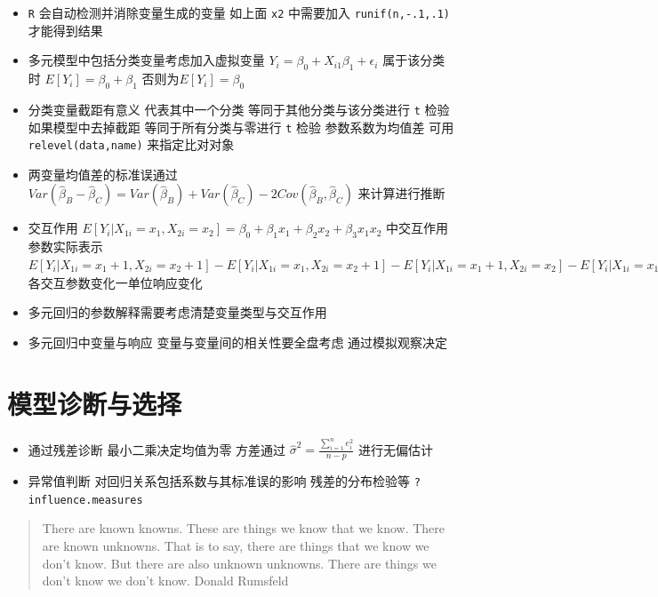 \documentclass[]{book}
\providecommand{\tightlist}{%
  \setlength{\itemsep}{0pt}\setlength{\parskip}{0pt}}
\begin{document}
\begin{itemize}
\tightlist
\item
  \texttt{R} 会自动检测并消除变量生成的变量 如上面 \texttt{x2} 中需要加入 \texttt{runif(n,-.1,.1)} 才能得到结果
\item
  多元模型中包括分类变量考虑加入虚拟变量 \(Y_i = \beta_0 + X_{i1} \beta_1 + \epsilon_{i}\) 属于该分类时 \(E[Y_i] = \beta_0 + \beta_1\) 否则为\(E[Y_i] = \beta_0\)
\item
  分类变量截距有意义 代表其中一个分类 等同于其他分类与该分类进行 \texttt{t} 检验 如果模型中去掉截距 等同于所有分类与零进行 \texttt{t} 检验 参数系数为均值差 可用 \texttt{relevel(data,\textquotesingle{}name\textquotesingle{})} 来指定比对对象
\item
  两变量均值差的标准误通过 \(Var(\hat \beta_B - \hat \beta_C) = Var(\hat \beta_B) + Var(\hat \beta_C) - 2 Cov(\hat \beta_B, \hat \beta_C)\) 来计算进行推断
\item
  交互作用 \(E[Y_i | X_{1i}=x_1, X_{2i}=x_2] = \beta_0 + \beta_1 x_{1} + \beta_2 x_{2} + \beta_3 x_{1}x_{2}\) 中交互作用参数实际表示 \(E[Y_i | X_{1i}=x_1+1, X_{2i}=x_2+1]-E[Y_i | X_{1i}=x_1, X_{2i}=x_2+1]-E[Y_i | X_{1i}=x_1+1, X_{2i}=x_2]-E[Y_i | X_{1i}=x_1, X_{2i}=x_2] =\beta_3\) 各交互参数变化一单位响应变化
\item
  多元回归的参数解释需要考虑清楚变量类型与交互作用
\item
  多元回归中变量与响应 变量与变量间的相关性要全盘考虑 通过模拟观察决定
\end{itemize}

\hypertarget{ux6a21ux578bux8bcaux65adux4e0eux9009ux62e9}{%
\section{模型诊断与选择}\label{ux6a21ux578bux8bcaux65adux4e0eux9009ux62e9}}

\begin{itemize}
\tightlist
\item
  通过残差诊断 最小二乘决定均值为零 方差通过 \(\hat \sigma^2 = \frac{\sum_{i=1}^n e_i^2}{n-p}\) 进行无偏估计
\item
  异常值判断 对回归关系包括系数与其标准误的影响 残差的分布检验等 \texttt{?influence.measures}
\end{itemize}

\begin{quote}
There are known knowns. These are things we know that we know. There are known unknowns. That is to say, there are things that we know we don't know. But there are also unknown unknowns. There are things we don't know we don't know. Donald Rumsfeld
\end{quote}
\end{document}
